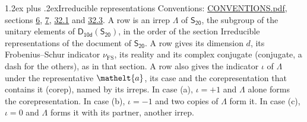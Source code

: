 \documentclass[10pt,a4paper]{article}
\makeatletter
\renewcommand\section{\@startsection{section}{1}{\z@}{-3ex plus -1ex minus -.2ex}%
  {1.2ex plus .2ex}{\normalfont\large\sffamily\bfseries\color{parttitle}}}
\numberwithin{equation}{section}
\newcommand{\eltfont}[1]{{\let\sigma\eltsigma\mathelt{#1}}}
\newcommand{\grp}[1]{\mathsf{#1}}
\newcommand{\elt}[1]{\eltfont{#1}}
\newcommand{\fsind}{\nu_{\mathrm{FS}}}
\makeatother
\begin{document}
\section{Irreducible representations}\label{s:irreps}
Conventions: \href{../../CONVENTIONS.pdf}{CONVENTIONS.pdf}, sections \href{../../../rotation/CONVENTIONS.pdf\#conv.6}{6}, \href{../../../rotation/CONVENTIONS.pdf\#conv.7}{7}, \href{../../CONVENTIONS.pdf\#conv.32.1}{32.1} and \href{../../CONVENTIONS.pdf\#conv.32.3}{32.3}.
\leavevmode\label{n:irrep.Delta}A row is an irrep $\Lambda$ of $\grp{S_{20}}$, the subgroup of the unitary elements of $\grp{D_{10d}}(\grp{S_{20}})$, in the order of the section Irreducible representations of the document of \href{../../../rotation/data/pdf/S20.pdf}{$\grp{S_{20}}$}. \label{n:index.dimension}\label{n:index.frobenius}\label{n:head.irrep}\label{n:head.reality}\label{n:head.conjugate}A row gives its dimension $d$, its Frobenius--Schur indicator $\fsind$, its reality and its complex conjugate (conjugate, a dash for the others), as in that section. \label{n:head.case.corep}\label{n:head.corep}A row also gives the indicator $\iota$ of $\Lambda$ under the representative $\elt{a}$, its case and the corepresentation that contains it (corep), named by its irreps. In case (a), $\iota = +1$ and $\Lambda$ alone forms the corepresentation. In case (b), $\iota = -1$ and two copies of $\Lambda$ form it. In case (c), $\iota = 0$ and $\Lambda$ forms it with its partner, another irrep.
\setlength{\emergencystretch}{2em}\par\setlength{\emergencystretch}{0pt}
\end{document}
